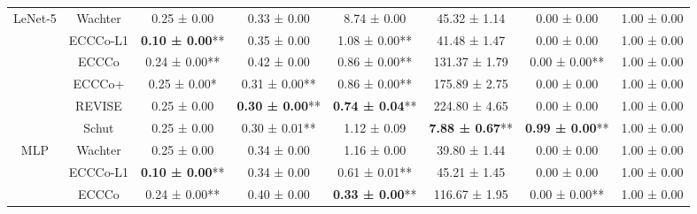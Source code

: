 \begin{table}
{\begin{tabular}[t]{cccccccc}
\multirow[t]{-6}{*}{\centering\arraybackslash LeNet-5} & Wachter & 0.25 ± 0.00\hphantom{*}\hphantom{*} & 0.33 ± 0.00\hphantom{*}\hphantom{*} & 8.74 ± 0.00\hphantom{*}\hphantom{*} & 45.32 ± 1.14\hphantom{*}\hphantom{*} & 0.00 ± 0.00\hphantom{*}\hphantom{*} & 1.00 ± 0.00\hphantom{*}\hphantom{*}\\
\cmidrule{1-8}
 & ECCCo-L1 & \textbf{0.10 ± 0.00}** & 0.35 ± 0.00\hphantom{*}\hphantom{*} & 1.08 ± 0.00** & 41.48 ± 1.47\hphantom{*}\hphantom{*} & 0.00 ± 0.00\hphantom{*}\hphantom{*} & 1.00 ± 0.00\hphantom{*}\hphantom{*}\\

 & ECCCo & 0.24 ± 0.00** & 0.42 ± 0.00\hphantom{*}\hphantom{*} & 0.86 ± 0.00** & 131.37 ± 1.79\hphantom{*}\hphantom{*} & 0.00 ± 0.00** & 1.00 ± 0.00\hphantom{*}\hphantom{*}\\

 & ECCCo+ & 0.25 ± 0.00*\hphantom{*} & 0.31 ± 0.00** & 0.86 ± 0.00** & 175.89 ± 2.75\hphantom{*}\hphantom{*} & 0.00 ± 0.00\hphantom{*}\hphantom{*} & 1.00 ± 0.00\hphantom{*}\hphantom{*}\\

 & REVISE & 0.25 ± 0.00\hphantom{*}\hphantom{*} & \textbf{0.30 ± 0.00}** & \textbf{0.74 ± 0.04}** & 224.80 ± 4.65\hphantom{*}\hphantom{*} & 0.00 ± 0.00\hphantom{*}\hphantom{*} & 1.00 ± 0.00\hphantom{*}\hphantom{*}\\

 & Schut & 0.25 ± 0.00\hphantom{*}\hphantom{*} & 0.30 ± 0.01** & 1.12 ± 0.09\hphantom{*}\hphantom{*} & \textbf{7.88 ± 0.67}** & \textbf{0.99 ± 0.00}** & 1.00 ± 0.00\hphantom{*}\hphantom{*}\\

\multirow[t]{-6}{*}{\centering\arraybackslash MLP} & Wachter & 0.25 ± 0.00\hphantom{*}\hphantom{*} & 0.34 ± 0.00\hphantom{*}\hphantom{*} & 1.16 ± 0.00\hphantom{*}\hphantom{*} & 39.80 ± 1.44\hphantom{*}\hphantom{*} & 0.00 ± 0.00\hphantom{*}\hphantom{*} & 1.00 ± 0.00\hphantom{*}\hphantom{*}\\
\cmidrule{1-8}
 & ECCCo-L1 & \textbf{0.10 ± 0.00}** & 0.34 ± 0.00\hphantom{*}\hphantom{*} & 0.61 ± 0.01** & 45.21 ± 1.45\hphantom{*}\hphantom{*} & 0.00 ± 0.00\hphantom{*}\hphantom{*} & 1.00 ± 0.00\hphantom{*}\hphantom{*}\\

 & ECCCo & 0.24 ± 0.00** & 0.40 ± 0.00\hphantom{*}\hphantom{*} & \textbf{0.33 ± 0.00}** & 116.67 ± 1.95\hphantom{*}\hphantom{*} & 0.00 ± 0.00** & 1.00 ± 0.00\hphantom{*}\hphantom{*}\\


\end{tabular}}
\end{table}
